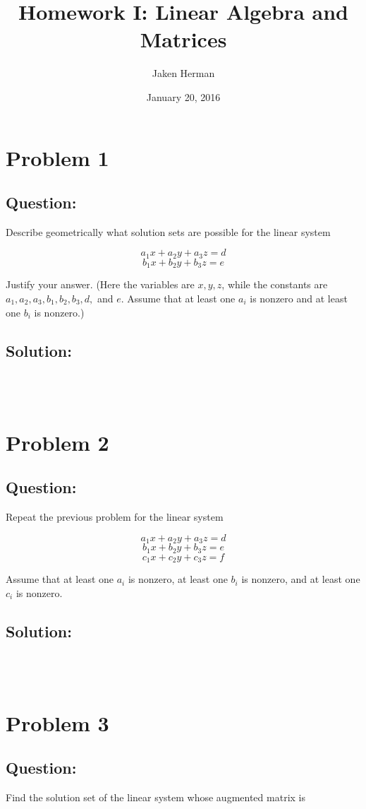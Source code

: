 \documentclass{article}
\title{Homework I: Linear Algebra and Matrices}
\author{Jaken Herman }
\date{January 20, 2016}
\begin{document}
\maketitle

\section*{Problem 1}
\subsection*{Question:}
Describe geometrically what solution sets are possible for the linear system

$$a_{1}x + a_{2}y + a_{3}z = d$$
$$b_{1}x + b_{2}y + b_{3}z = e$$

Justify your answer. (Here the variables are $x, y, z$, while the constants are $a_{1}, a_{2}, a_{3}, b_{1}, b_{2}, b_{3}, d,$ and $e$. Assume that at least one $a_{i}$ is nonzero and at least one $b_{i}$ is nonzero.)

\subsection*{Solution:}
\\
\\
\section*{Problem 2}
\subsection*{Question:}
Repeat the previous problem for the linear system

$$a_{1}x + a_{2}y + a_{3}z = d$$
$$b_{1}x + b_{2}y + b_{3}z = e$$
$$c_{1}x + c_{2}y + c_{3}z = f$$

Assume that at least one $a_{i}$ is nonzero, at least one $b_{i}$ is nonzero, and at least one $c_{i}$ is nonzero.

\subsection*{Solution:}
\\
\\
\section*{Problem 3}
\subsection*{Question:}
Find the solution set of the linear system whose augmented matrix is 
\end{document}
